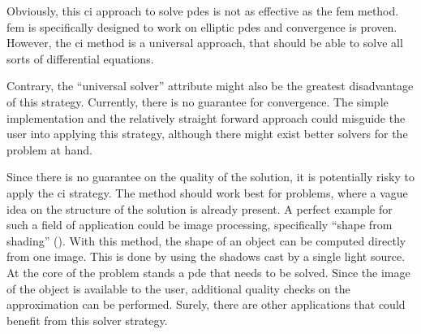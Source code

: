 \documentclass[./\jobname.tex]{subfiles}
\begin{document}
Obviously, this \gls{ci} approach to solve \gls{pde}s is not as effective as the \gls{fem} method. \gls{fem} is specifically designed to work on elliptic \gls{pde}s and convergence is proven. However, the \gls{ci} method is a universal approach, that should be able to solve all sorts of differential equations. 

Contrary, the ``universal solver'' attribute might also be the greatest disadvantage of this strategy. Currently, there is no guarantee for convergence. The simple implementation and the relatively straight forward approach could misguide the user into applying this strategy, although there might exist better solvers for the problem at hand. 

Since there is no guarantee on the quality of the solution, it is potentially risky to apply the \gls{ci} strategy. The method should work best for problems, where a vague idea on the structure of the solution is already present. A perfect example for such a field of application could be image processing, specifically ``shape from shading'' (\cite{horn_shape_1970}). With this method, the shape of an object can be computed directly from one image. This is done by using the shadows cast by a single light source. At the core of the problem stands a \gls{pde} that needs to be solved. Since the image of the object is available to the user, additional quality checks on the approximation can be performed. Surely, there are other applications that could benefit from this solver strategy. 
\end{document}
